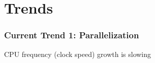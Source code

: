 \section{Trends}

\begin{frame}
    \frametitle{Current Trend 1: Parallelization}

    CPU frequency (clock speed) growth is slowing

    \begin{figure}
       \begin{center}
       \end{center}
    \end{figure}

\end{frame}


